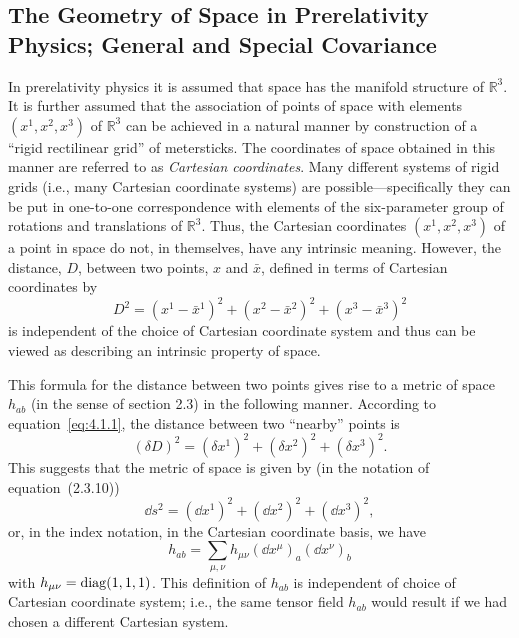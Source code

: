 
\subsection{The Geometry of Space in Prerelativity Physics; General and Special
\mbox{Covariance}}\label{sec:4.1}

In prerelativity physics it is assumed that space has the manifold structure of
\(\mathbb R^3\). It is further assumed that the association of points of space
with elements \((x^1,x^2,x^3)\) of \(\mathbb R^3\) can be achieved in a
natural manner by construction of a \textquotedblleft rigid rectilinear
grid\textquotedblright{} of metersticks. The coordinates of space obtained in
this manner are referred to as \emph{Cartesian coordinates}. Many different
systems of rigid grids (i.e., many Cartesian coordinate systems) are
possible---specifically they can be put in one-to-one correspondence with
elements of the six-parameter group of rotations and translations of
\(\mathbb R^3\). Thus, the Cartesian coordinates \((x^1,x^2,x^3)\) of a
point in space do not, in themselves, have any intrinsic meaning. However, the
distance, \(D\), between two points, \(x\) and \(\bar x\), defined in terms
of Cartesian coordinates by
\begin{equation}
  D^2=(x^1-\bar x^1)^2+(x^2-\bar x^2)^2+(x^3-\bar x^3)^2
  \tag{4.1.1}\label{eq:4.1.1}
\end{equation}
is independent of the choice of Cartesian coordinate system and thus can be
viewed as describing an intrinsic property of space.

This formula for the distance between two points gives rise to a metric of space
\(h_{ab}\) (in the sense of section 2.3) in the following manner. According to
equation~\eqref{eq:4.1.1}, the distance between two
\textquotedblleft nearby\textquotedblright{} points is
\begin{equation}
  (\delta D)^2=(\delta x^1)^2+(\delta x^2)^2+(\delta x^3)^2 .
  \tag{4.1.2}\label{eq:4.1.2}
\end{equation}
This suggests that the metric of space is given by (in the notation of
equation~(2.3.10))
\begin{equation}
  \dd s^2=(\dd x^1)^2+(\dd x^2)^2+(\dd x^3)^2 ,
  \tag{4.1.3}\label{eq:4.1.3}
\end{equation}
or, in the index notation, in the Cartesian coordinate basis, we have
\begin{equation}
  h_{ab}=\sum_{\mu,\nu}h_{\mu\nu}(\dd x^\mu)_a(\dd x^\nu)_b
  \tag{4.1.4}\label{eq:4.1.4}
\end{equation}
with \(h_{\mu\nu}=\operatorname{diag}(1,1,1)\). This definition of \(h_{ab}\) is
independent of choice of Cartesian coordinate system; i.e., the same tensor field
\(h_{ab}\) would result if we had chosen a different Cartesian system.

